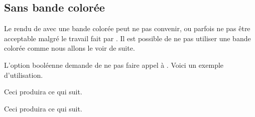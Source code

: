 \documentclass[10pt, a4paper]{article}
\begin{document}

\subsection{Sans bande colorée}

Le rendu de  avec une bande colorée peut ne pas convenir, ou parfois ne pas être acceptable malgré le travail fait par .
Il est possible de ne pas utiliser une bande colorée comme nous allons le voir de suite.

\begin{bdocexa}
    L'option booléenne  demande de ne pas faire appel à .
    Voici un exemple d'utilisation.


    Ceci produira ce qui suit.

    \medskip

    
\end{bdocexa}




\begin{bdocexa}
    \leavevmode


    Ceci produira ce qui suit.

    \medskip

    
\end{bdocexa}
\end{document}
